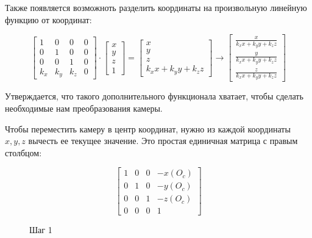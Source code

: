 \documentclass{article}
\begin{document}
Также появляется возможноть разделить координаты на произвольную линейную функцию от координат:

$$\begin{bmatrix} 1 & 0 & 0 & 0 \\ 0 & 1 & 0 & 0 \\ 0 & 0 & 1 & 0 \\ k_x & k_y & k_z & 0\end{bmatrix} \cdot\begin{bmatrix} x \\ y \\ z \\ 1 \end{bmatrix} = \begin{bmatrix} x \\ y \\ z \\ k_xx + k_yy + k_zz\end{bmatrix} \to \begin{bmatrix}\frac{x}{k_xx + k_yy + k_zz} \\\frac{y}{k_xx + k_yy + k_zz} \\\frac{z}{k_xx + k_yy + k_zz} \end{bmatrix}$$

Утверждается, что такого дополнительного функционала хватает, чтобы сделать необходимые нам преобразования камеры.

	
Чтобы переместить камеру в центр координат, нужно из каждой координаты $x, y, z$ вычесть ее текущее значение. Это простая единичная матрица с правым столбцом:

$$
\begin{bmatrix}
1 & 0 & 0 & -x(O_c) \\
0 & 1 & 0 & -y(O_c) \\
0 & 0 & 1 & -z(O_c) \\
0 & 0 & 0 & 1
\end{bmatrix}
$$

\begin{center}
\begin{figure}[H]
\caption{Шаг 1}
\label{ris:image}
\end{figure}
\end{center}
\end{document}
